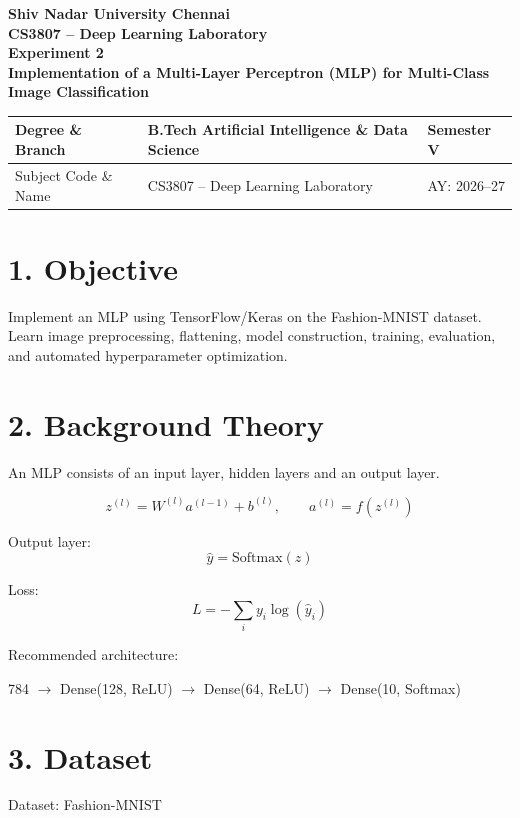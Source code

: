 \documentclass[11pt]{article}
\begin{document}
\begin{center}
{\Large\textbf{Shiv Nadar University Chennai}}\\
\textbf{CS3807 -- Deep Learning Laboratory}\\
\textbf{Experiment 2}\\
{\large\textbf{Implementation of a Multi-Layer Perceptron (MLP) for Multi-Class Image Classification}}
\end{center}

\renewcommand{\arraystretch}{1.25}

\begin{tabular}{|p{3.8cm}|p{8cm}|p{2cm}|}
\hline
Degree \& Branch & B.Tech Artificial Intelligence \& Data Science & Semester V\\ \hline
Subject Code \& Name & CS3807 -- Deep Learning Laboratory & AY: 2026--27\\ \hline
\end{tabular}

\section*{1. Objective}
Implement an MLP using TensorFlow/Keras on the Fashion-MNIST dataset. Learn image preprocessing, flattening, model construction, training, evaluation, and automated hyperparameter optimization.



\section*{2. Background Theory}
An MLP consists of an input layer, hidden layers and an output layer.

\[
z^{(l)}=W^{(l)}a^{(l-1)}+b^{(l)},\qquad
a^{(l)}=f(z^{(l)})
\]

Output layer:
\[
\hat y=\mathrm{Softmax}(z)
\]

Loss:
\[
L=-\sum_i y_i\log(\hat y_i)
\]

Recommended architecture:

\begin{center}
784 $\rightarrow$ Dense(128, ReLU) $\rightarrow$ Dense(64, ReLU) $\rightarrow$ Dense(10, Softmax)
\end{center}

\section*{3. Dataset}
Dataset: Fashion-MNIST
\end{document}
